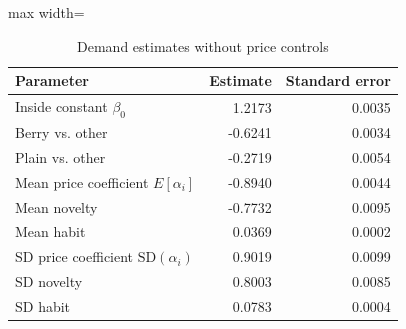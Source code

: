 \begin{table}[htbp]\centering\small
\caption{Demand estimates without price controls}
\label{tab:demand-estimates}
\begin{adjustbox}{max width=\linewidth}
\begin{tabular}{lrr}\toprule
Parameter & Estimate & Standard error\\\midrule
Inside constant $\beta_0$ & 1.2173 & 0.0035 \\
Berry vs. other & -0.6241 & 0.0034 \\
Plain vs. other & -0.2719 & 0.0054 \\
Mean price coefficient $E[\alpha_i]$ & -0.8940 & 0.0044 \\
Mean novelty & -0.7732 & 0.0095 \\
Mean habit & 0.0369 & 0.0002 \\
SD price coefficient $\mathrm{SD}(\alpha_i)$ & 0.9019 & 0.0099 \\
SD novelty & 0.8003 & 0.0085 \\
SD habit & 0.0783 & 0.0004 \\
\bottomrule\end{tabular}
\end{adjustbox}
\end{table}

